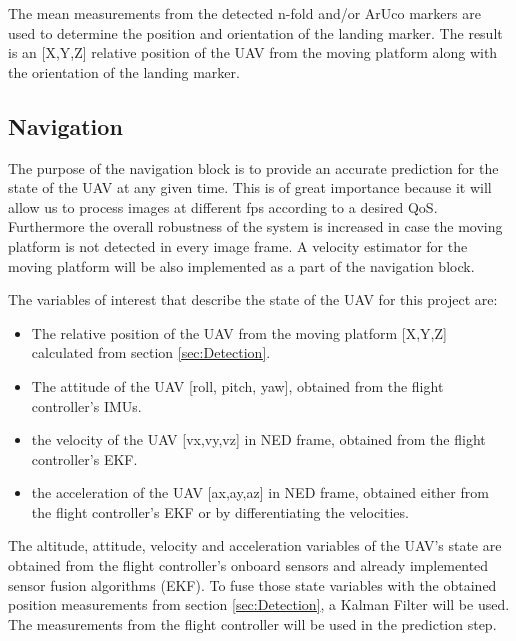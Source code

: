\documentclass[conference]{IEEEtran}
\begin{document}
The mean measurements from the detected n-fold and/or ArUco markers are used to determine the position and orientation of the landing marker. The result is an [X,Y,Z] relative position of the UAV from the moving platform along with the orientation of the landing marker.



\subsection{Navigation}
\label{sec:Navigation}

The purpose of the navigation block is to provide an accurate prediction for the state of the UAV at any given time. This is of great importance because it will allow us to process images at different fps according to a desired QoS. Furthermore the overall robustness of the system is increased in case the moving platform is not detected in every image frame. A velocity estimator for the moving platform will be also implemented as a part of the navigation block.

The variables of interest that describe the state of the UAV for this project are:

\begin{itemize}

\item The relative position of the UAV from the moving platform [X,Y,Z] calculated from section \ref{sec:Detection}.

\item The attitude of the UAV [roll, pitch, yaw], obtained from the flight controller's IMUs.

\item the velocity of the UAV [vx,vy,vz] in NED frame, obtained from the flight controller's EKF.

\item the acceleration of the UAV [ax,ay,az] in NED frame, obtained either from the flight controller's EKF or by differentiating the velocities.

\end{itemize}

The altitude, attitude, velocity and acceleration variables of the UAV's state are obtained from the flight controller's onboard sensors and already implemented sensor fusion algorithms (EKF). To fuse those state variables with the obtained position measurements from section \ref{sec:Detection}, a Kalman Filter will be used. The measurements from the flight controller will be used in the prediction step.
\end{document}

